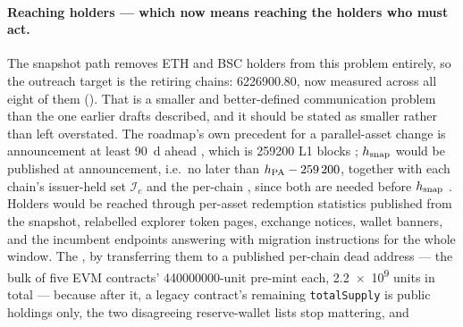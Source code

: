 \paragraph{Reaching holders --- which now means reaching the holders who must act.} The snapshot path
removes ETH and BSC holders from this problem entirely, so the outreach target is the retiring
chains: \num{6226900.80}\flux, now measured across all eight of them
(). That is a smaller and better-defined communication problem than the
one earlier drafts described, and it should be stated as smaller rather than left overstated. The
roadmap's own precedent for a parallel-asset change is announcement at least \SI{90}{\day} ahead
, which is \num{259200} L1 blocks \srcinferred;
$h_{\mathrm{snap}}$ would be published at announcement, i.e.\ no later than
$h_{\mathrm{PA}} - \num{259200}$, together with each chain's issuer-held set $\mathcal{I}_c$ and the per-chain
, since both are needed before
$h_{\mathrm{snap}}$ . Holders would be reached through per-asset redemption statistics
published from the snapshot, relabelled explorer token pages, exchange notices, wallet banners, and
the incumbent \Fusion endpoints answering with migration instructions for the whole window. The
, by transferring them to a published per-chain dead address
 --- the bulk of five EVM contracts' \num{440000000}-unit pre-mint each,
\num{2.2e9} units in total \srcinferred --- because after it, a legacy contract's remaining
\texttt{totalSupply} is public holdings only, the two disagreeing reserve-wallet lists stop
mattering, and 

